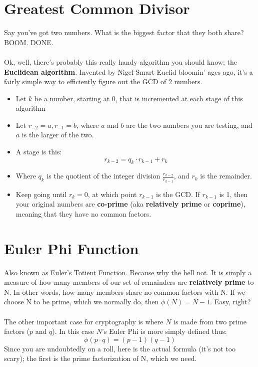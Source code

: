     \section{Greatest Common Divisor}
    Say you've got two numbers. What is the biggest factor that they both share? BOOM. DONE.\\
    \\
    Ok, well, there's probably this really handy algorithm you should know; the \textbf{Euclidean algorithm}. Invented by \sout{Nigel Smart} Euclid bloomin' ages ago, it's a fairly simple way to efficiently figure out the GCD of 2 numbers.
        \begin{itemize}
            \item Let $k$ be a number, starting at 0, that is incremented at each stage of this algorithm
            \item Let $r_{-2} = a, r_{-1} = b$, where $a$ and $b$ are the two numbers you are testing, and $a$ is the larger of the two.
            \item A stage is this: 
                $$
                    r_{k-2} = q_{k} \cdot r_{k-1} + r_{k}
                $$
            \item Where $q_{k}$ is the quotient of the integer division $\frac{r_{k-2}}{r_{k-1}}$, and $r_{k}$ is the remainder.
            \item Keep going until $r_{k} = 0$, at which point $r_{k-1}$ is the GCD. If $r_{k-1}$ is 1, then your original numbers are \textbf{co-prime} (aka \textbf{relatively prime} or \textbf{coprime}), meaning that they have no common factors.
        \end{itemize}
    
    \section{Euler Phi Function}
    Also known as Euler's Totient Function. Because why the hell not. It is simply a measure of how many members of our set of remainders are \textbf{relatively prime} to N. In other words, how many members share no common factors with N. If we choose N to be prime, which we normally do, then $\phi(N) = N - 1$. Easy, right?\\
    \\
    The other important case for cryptography is where $N$ is made from two prime factors ($p$ and $q$). In this case $N$'s Euler Phi is more simply defined thus:
    $$ \phi(p \cdot q) = (p-1)(q-1)$$
    Since you are undoubtedly on a roll, here is the actual formula (it's not too scary); the first is the prime factorization of N, which we need.

